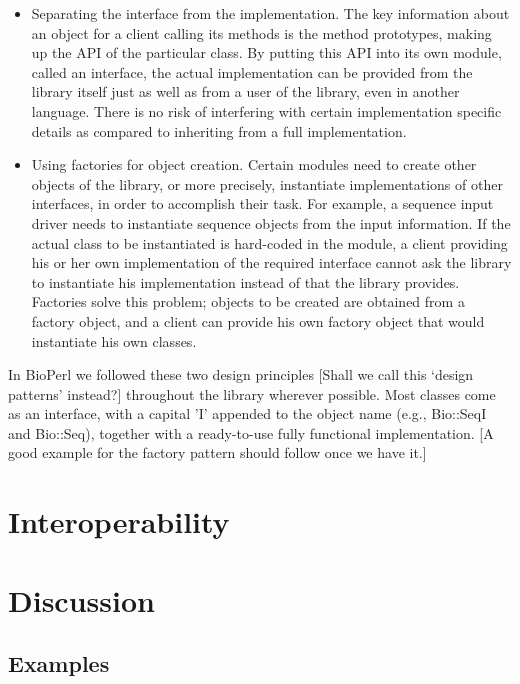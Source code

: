 \documentclass{article}
\begin{document}
\begin{twocolumn}
\begin{itemize}
\item Separating the interface from the
implementation. The key information about an object for a client
calling its methods is the method prototypes, making up the API of the
particular class. By putting this API into its own module, called an
interface, the actual implementation can be provided from the library
itself just as well as from a user of the library, even in another
language. There is no risk of interfering with certain implementation
specific details as compared to inheriting from a full implementation.

\item Using factories for object creation. Certain modules need to
create other objects of the library, or more precisely, instantiate
implementations of other interfaces, in order to accomplish their
task. For example, a sequence input driver needs to instantiate
sequence objects from the input information. If the actual class to be
instantiated is hard-coded in the module, a client providing his or
her own implementation of the required interface cannot ask the
library to instantiate his implementation instead of that the library
provides. Factories solve this problem; objects to be created are
obtained from a factory object, and a client can provide his own
factory object that would instantiate his own classes.

\end{itemize}

In BioPerl we followed these two design principles [Shall we call this
`design patterns' instead?] throughout the library wherever
possible. Most classes come as an interface, with a capital 'I'
appended to the object name (e.g., Bio::SeqI and Bio::Seq), together
with a ready-to-use fully functional implementation. [A good example
for the factory pattern should follow once we have it.]

\section{Interoperability}


\section{Discussion}

\subsection{Examples}


\end{twocolumn}
\end{document}
